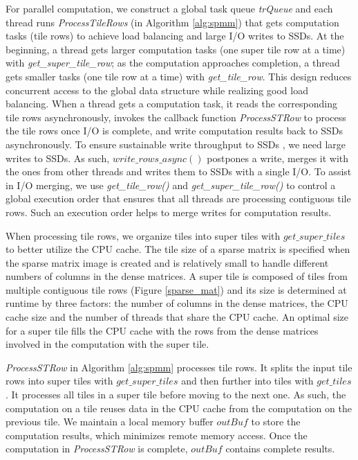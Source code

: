 For parallel computation, we construct a global task queue \textit{trQueue}
and each thread runs \textit{ProcessTileRows} (in Algorithm \ref{alg:spmm})
that gets computation tasks (tile rows) to achieve load balancing and large
I/O writes to SSDs.
At the beginning, a thread gets larger computation tasks (one super tile row at
a time) with \textit{get\_super\_tile\_row}; as the computation approaches
completion, a thread gets smaller tasks (one tile row at a time) with
\textit{get\_tile\_row}. This design reduces concurrent access to
the global data structure while realizing good load balancing. When a thread
gets a computation task, it reads the corresponding tile rows asynchronously,
invokes the callback function \textit{ProcessSTRow} to process the tile rows
once I/O is complete, and write computation results back to SSDs asynchronously.
To ensure sustainable write throughput to SSDs \cite{sfs}, we need large writes
to SSDs. As such, $write\_rows\_async()$ postpones a write, merges it with
the ones from other threads and writes them to SSDs with a single I/O.
To assist in I/O merging, we use \textit{get\_tile\_row()} and
\textit{get\_super\_tile\_row()} to control a global execution order that
ensures that all threads are processing contiguous tile rows. Such an execution
order helps to merge writes for computation results.

When processing tile rows, we organize tiles into super tiles with
$get\_super\_tiles$ to better utilize the CPU cache. The tile size of a sparse
matrix is specified when the sparse matrix image is created and is relatively
small to handle different numbers of columns in the dense matrices. A super tile
is composed of tiles from multiple contiguous tile rows (Figure \ref{sparse_mat})
and its size is determined at runtime by three factors: the number of columns
in the dense matrices, the CPU cache size and the number of threads that
share the CPU cache. An optimal size for a super tile fills
the CPU cache with the rows from the dense matrices involved in
the computation with the super tile.

\textit{ProcessSTRow} in Algorithm \ref{alg:spmm} processes tile rows.
It splits the input tile rows into super tiles with $get\_super\_tiles$ and
then further into tiles with $get\_tiles$. It processes all tiles in a super
tile before moving to the next one. As such, the computation on a tile reuses
data in the CPU cache from the computation on the previous tile. We maintain
a local memory buffer $outBuf$ to store the computation results,
which minimizes remote memory access. Once the computation in \textit{ProcessSTRow}
is complete, $outBuf$ contains complete results.

